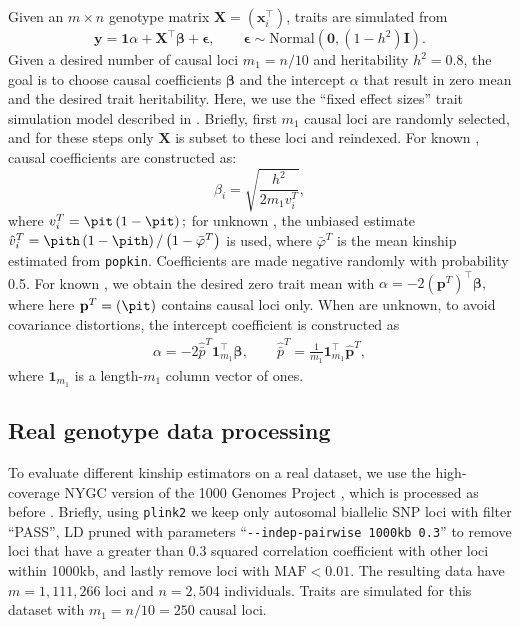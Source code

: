 \documentclass[11pt]{article}
\begin{document}
Given an $m \times n$ genotype matrix $\mathbf{X} = (\mathbf{x}_i^\intercal)$, traits are simulated from
$$
\mathbf{y}
=
\mathbf{1} \alpha + \mathbf{X}^\intercal \boldsymbol{\beta} + \boldsymbol{\epsilon}
, \quad\quad
\boldsymbol{\epsilon} \sim \text{Normal}(\mathbf{0}, (1 - h^2) \mathbf{I})
.
$$
Given a desired number of causal loci $m_1 = n/10$ and heritability $h^2=0.8$, the goal is to choose causal coefficients $\boldsymbol{\beta}$ and the intercept $\alpha$ that result in zero mean and the desired trait heritability.
Here, we use the ``fixed effect sizes'' trait simulation model described in \citep{yao_limitations_2022}.
Briefly, first $m_1$ causal loci are randomly selected, and for these steps only $\mathbf{X}$ is subset to these loci and reindexed.
For known \pit, causal coefficients are constructed as:
$$
\beta_i = \sqrt{ \frac{h^2}{ 2 m_1 v_i^T } },
$$
where
$
v_i^T
=
\pit \left( 1 - \pit \right)
;
$
for unknown \pit, the unbiased estimate
$
\hat{v}_i^T
=
\pith \left( 1 - \pith \right) / \left( 1 - \bar{\varphi}^T \right)
$
is used, where $\bar{\varphi}^T$ is the mean kinship estimated from \texttt{popkin}.
Coefficients are made negative randomly with probability 0.5.
For known \pit, we obtain the desired zero trait mean with
$
\alpha 
=
- 2 \left( \mathbf{p}^T \right)^\intercal \boldsymbol{\beta}
,
$
where here $\mathbf{p}^T = (\pit)$ contains causal loci only.
When \pit are unknown, to avoid covariance distortions, the intercept coefficient is constructed as
\begin{align*}
  \alpha 
  =
  - 2 \hat{\bar{p}}^T \mathbf{1}_{m_1}^\intercal \boldsymbol{\beta}
  , \quad\quad
  \hat{\bar{p}}^T
  =
  \frac{1}{m_1} \mathbf{1}_{m_1}^\intercal \mathbf{\hat{p}}^T
  ,
\end{align*}
where $\mathbf{1}_{m_1}$ is a length-$m_1$ column vector of ones.

\subsection{Real genotype data processing}

To evaluate different kinship estimators on a real dataset, we use the high-coverage NYGC version of the 1000 Genomes Project \citep{fairley_international_2020}, which is processed as before \citep{yao_limitations_2022}.
Briefly, using \texttt{plink2} \citep{chang_second-generation_2015} we keep only autosomal biallelic SNP loci with filter ``PASS'', LD pruned with parameters ``\texttt{-{}-indep-pairwise 1000kb 0.3}'' to remove loci that have a greater than 0.3 squared correlation coefficient with other loci within 1000kb, and lastly remove loci with $\text{MAF} < 0.01$.
The resulting data have $m=1,111,266$ loci and $n=2,504$ individuals.
Traits are simulated for this dataset with $m_1 = n/10 = 250$ causal loci.
\end{document}

